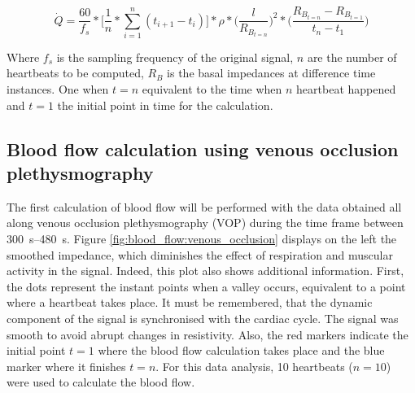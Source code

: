 \begin{equation}
\label{eq:QL}
\dot{Q} = \frac{60}{f_s}*\Bigg[\frac{1}{n}*\sum_{i=1}^{n}(t_{i+1} - t_{i}) \Bigg] * \rho * \Bigg( \frac{l}{R_{B_{t=n}}} \Bigg) ^2 *\Bigg(\frac{R_{B_{t=n}}-R_{B_{t=1}}}{t_{n}-t_{1}}\Bigg)
\end{equation}


Where $f_s$ is the sampling frequency of the original signal, $n$ are the number of heartbeats to be computed, $R_B$ is the basal impedances at difference time instances. One when $t=n$ equivalent to the time when $n$ heartbeat happened and $t=1$ the initial point in time for the calculation. 

\subsection{Blood flow calculation using venous occlusion plethysmography}
\label{section occlusion 2.1}
The first calculation of blood flow will be performed with the data obtained all along venous occlusion plethysmography (VOP) during the time frame between \SIrange{300}{480}{\second}. Figure \ref{fig:blood_flow:venous_occlusion} displays on the left the smoothed impedance, which diminishes the effect of respiration and muscular activity in the signal. Indeed, this plot also shows additional information. First, the dots represent the instant points when a valley occurs, equivalent to a point where a heartbeat takes place. It must be remembered, that the dynamic component of the signal is synchronised with the cardiac cycle. The signal was smooth to avoid abrupt changes in resistivity. Also, the red markers indicate the initial point $t=1$ where the blood flow calculation takes place and the blue marker where it finishes $t=n$. For this data analysis, 10 heartbeats ($n=10$) were used to calculate the blood flow.

